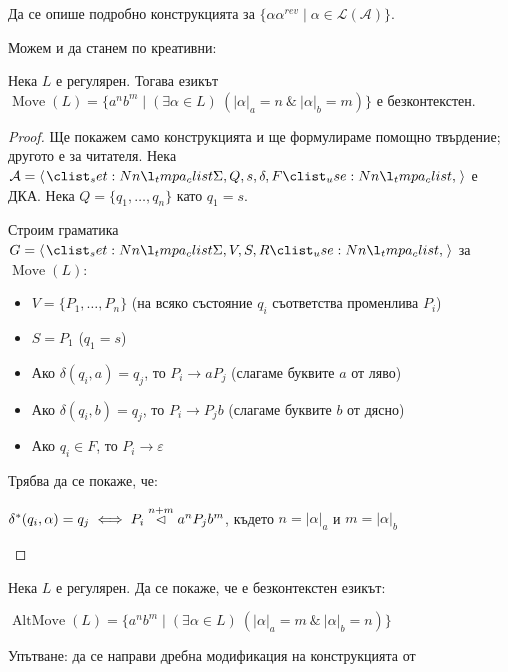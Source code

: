 \begin{problem}
Да се опише подробно конструкцията за $\{ \alpha \alpha^{rev} \mid \alpha \in \mathcal{L(A)} \}$.
\end{problem}

Можем и да станем по креативни:
\begin{claim}
    Нека $L$ е регулярен.
    Тогава езикът $\operatorname{Move}(L) = \{ a^nb^m \mid (\exists \alpha \in L) \: (|\alpha|_a = n \: \& \: |\alpha|_b = m) \}$ е безконтекстен.
\end{claim}

\begin{proof}
    Ще покажем само конструкцията и ще формулираме помощно твърдение; другото е за читателя.
    Нека $\mathcal{A} = \opair{\Sigma, Q, s, \delta, F}$ е ДКА.
    Нека $Q = \{ q_1, \dots, q_n \}$ като $q_1 = s$.

    Строим граматика $G = \opair{\Sigma, V, S, R}$ за $\operatorname{Move}(L)$:
    \begin{itemize}
        \item $V = \{ P_1, \dots, P_n \}$ (на всяко състояние $q_i$ съответства променлива $P_i$)
        \item $S = P_1$ ($q_1 = s$)
        \item Ако $\delta(q_i, a) = q_j$, то $P_i \rightarrow a P_j$ (слагаме буквите $a$ от ляво)
        \item Ако $\delta(q_i, b) = q_j$, то $P_i \rightarrow P_j b$ (слагаме буквите $b$ от дясно)
        \item Ако $q_i \in F$, то $P_i \rightarrow \varepsilon$
    \end{itemize}

    Трябва да се покаже, че:
    \begin{center}
        $\delta^*(q_i, \alpha) = q_j \iff P_i \stackrel{n + m}{\vartriangleleft} a^{n} P_j b^{m}$, където $n = |\alpha|_a$ и $m = |\alpha|_b$
    \end{center}
\end{proof}

\begin{problem}
Нека $L$ е регулярен.
Да се покаже, че е безконтекстен езикът:
\begin{center}
    $\operatorname{AltMove}(L) = \{ a^nb^m \mid (\exists \alpha \in L) \: (|\alpha|_a = m \: \& \: |\alpha|_b = n) \}$
\end{center}
Упътване: да се направи дребна модификация на конструкцията от 
\end{problem}

